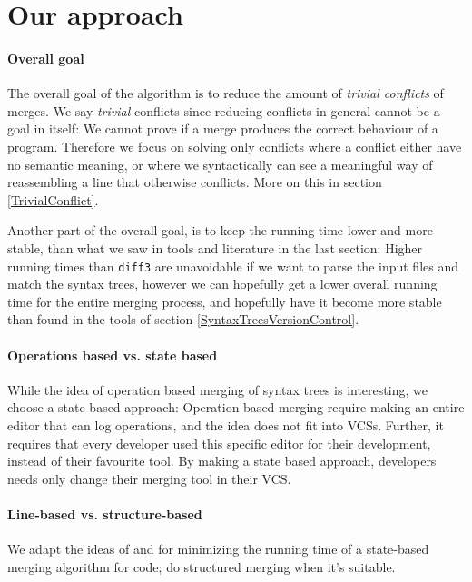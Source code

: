 \documentclass[11pt]{article}
\begin{document}
\clearpage

\section{Our approach}

\paragraph{Overall goal} The overall goal of the algorithm is to reduce the amount of \textit{trivial conflicts} of merges. We say \textit{trivial} conflicts since reducing conflicts in general cannot be a goal in itself: We cannot prove if a merge produces the correct behaviour of a program. Therefore we focus on solving only conflicts where a conflict either have no semantic meaning, or where we syntactically can see a meaningful way of reassembling a line that otherwise conflicts. More on this in section \ref{TrivialConflict}.

Another part of the overall goal, is to keep the running time lower and more stable, than what we saw in tools and literature in the last section: Higher running times than \texttt{diff3} are unavoidable if we want to parse the input files and match the syntax trees, however we can hopefully get a lower overall running time for the entire merging process, and hopefully have it become more stable than found in the tools of section \ref{SyntaxTreesVersionControl}.

\paragraph{Operations based vs. state based} While the idea of operation based merging of syntax trees is interesting, we choose a state based approach: Operation based merging require making an entire editor that can log operations, and the idea does not fit into VCSs. Further, it requires that every developer used this specific editor for their development, instead of their favourite tool. By making a state based approach, developers needs only change their merging tool in their VCS.

\paragraph{Line-based vs. structure-based} We adapt the ideas of \citet{Olav} and \citet{Apel} for minimizing the running time of a state-based merging algorithm for code; do structured merging when it's suitable.
\end{document}
